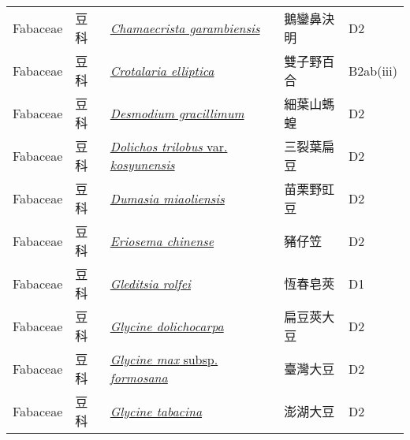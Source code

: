 {\begin{longtable}{p{2.5cm}p{2.5cm}p{4.5cm}p{2.5cm}p{3cm}}
    Fabaceae & 豆科 & \href{http://www.theplantlist.org/tpl1.1/search?q=Chamaecrista+garambiensis}{\textit{Chamaecrista garambiensis} } & 鵝鑾鼻決明 & D2 \index{Chamaecrista@\textit{Chamaecrista}!garambiensis@\textit{garambiensis}}  \index{鵝鑾鼻決明} \\
    Fabaceae & 豆科 & \href{http://www.theplantlist.org/tpl1.1/search?q=Crotalaria+elliptica}{\textit{Crotalaria elliptica} } & 雙子野百合 & B2ab(iii) \index{Crotalaria@\textit{Crotalaria}!elliptica@\textit{elliptica}}  \index{雙子野百合} \\
    Fabaceae & 豆科 & \href{http://www.theplantlist.org/tpl1.1/search?q=Desmodium+gracillimum}{\textit{Desmodium gracillimum} } & 細葉山螞蝗 & D2 \index{Desmodium@\textit{Desmodium}!gracillimum@\textit{gracillimum}}  \index{細葉山螞蝗} \\
    Fabaceae & 豆科 & \href{http://www.theplantlist.org/tpl1.1/search?q=Dolichos+trilobus+var.+kosyunensis}{\textit{Dolichos trilobus} var. \textit{kosyunensis} } & 三裂葉扁豆 & D2 \index{Dolichos@\textit{Dolichos}!trilobus@\textit{trilobus}!var. kosyunensis@var. \textit{kosyunensis}}  \index{三裂葉扁豆} \\
    Fabaceae & 豆科 & \href{http://www.theplantlist.org/tpl1.1/search?q=Dumasia+miaoliensis}{\textit{Dumasia miaoliensis} } & 苗栗野豇豆 & D2 \index{Dumasia@\textit{Dumasia}!miaoliensis@\textit{miaoliensis}}  \index{苗栗野豇豆} \\
    Fabaceae & 豆科 & \href{http://www.theplantlist.org/tpl1.1/search?q=Eriosema+chinense}{\textit{Eriosema chinense} } & 豬仔笠 & D2 \index{Eriosema@\textit{Eriosema}!chinense@\textit{chinense}}  \index{豬仔笠} \\
    Fabaceae & 豆科 & \href{http://www.theplantlist.org/tpl1.1/search?q=Gleditsia+rolfei}{\textit{Gleditsia rolfei} } & 恆春皂莢 & D1 \index{Gleditsia@\textit{Gleditsia}!rolfei@\textit{rolfei}}  \index{恆春皂莢} \\
    Fabaceae & 豆科 & \href{http://www.theplantlist.org/tpl1.1/search?q=Glycine+dolichocarpa}{\textit{Glycine dolichocarpa} } & 扁豆莢大豆 & D2 \index{Glycine@\textit{Glycine}!dolichocarpa@\textit{dolichocarpa}}  \index{扁豆莢大豆} \\
    Fabaceae & 豆科 & \href{http://www.theplantlist.org/tpl1.1/search?q=Glycine+max+subsp.+formosana}{\textit{Glycine max} subsp. \textit{formosana} } & 臺灣大豆 & D2 \index{Glycine@\textit{Glycine}!max@\textit{max}!subsp. formosana@subsp. \textit{formosana}}  \index{臺灣大豆} \\
    Fabaceae & 豆科 & \href{http://www.theplantlist.org/tpl1.1/search?q=Glycine+tabacina}{\textit{Glycine tabacina} } & 澎湖大豆 & D2 \index{Glycine@\textit{Glycine}!tabacina@\textit{tabacina}}  \index{澎湖大豆} \\

\end{longtable}}
